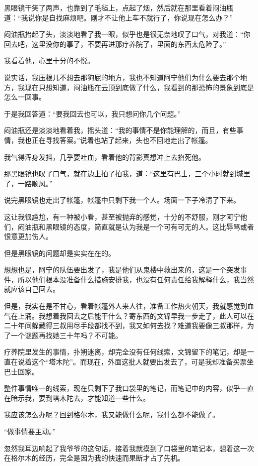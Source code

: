 黑眼镜干笑了两声，也靠到了毛毡上，点起了烟，然后就在那里看着闷油瓶道：“我说你是自找麻烦吧。刚才不让他上车不就行了，你说现在怎么办？”

闷油瓶抬起了头，淡淡地看了我一眼，似乎也是很无奈地叹了口气，对我道：“你回去吧，这里没你的事了，不要再进那疗养院了，里面的东西太危险了。”

我看着他，心里十分的不悦。

说实话，我压根儿不想去那狗屁的地方，我也不知道阿宁他们为什么要去那个地方，我现在只想知道，闷油瓶在云顶到底做了什么，我看到的那恐怖的景象到底是怎么一回事。

于是我回答道：“要我回去也可以，我只想问你几个问题。”

闷油瓶还是淡淡地看着我，摇头道：“我的事情不是你能理解的，而且，有些事情，我也正在寻找答案。”说着也站了起来，头也不回地走出了帐篷。

我气得浑身发抖，几乎要吐血，看着他的背影真想冲上去掐死他。

那黑眼镜也叹了口气，就在边上拍了拍我，道：“这里有巴士，三个小时就到城里了，一路顺风。”

说完黑眼镜也走出了帐篷，帐篷中只剩下我一个人。场面一下子冷清了下来。

这让我很尴尬，有一种被小看，甚至被抛弃的感觉，十分的不舒服，刚才阿宁他们，闷油瓶和黑眼镜的态度，简直就是认为我是一个可有可无的人。这比辱骂或者恨意更加伤人。

但是黑眼镜的问题却是实实在在的。

想想也是，阿宁的队伍要出发了，我是他们从鬼楼中救出来的，这是一个突发事件，所以他们根本没准备什么措施安排我，也没有任何责任给我解释什么，我当然就应该自己回去。

但是，我实在是不甘心，看着帐篷外人来人往，准备工作热火朝天，我就感觉到血气在上涌。我想着我回去之后能干什么？寄东西的文锦早我一步走了，此人可以在二十年间躲藏得三叔用尽手段都找不到，我又如何去找？难道我要像三叔那样，为了一个谜题再找她三十年吗？不可能。

疗养院里发生的事情，扑朔迷离，却完全没有任何线索，文锦留下的笔记，却是一直在说着这个“塔木陀”。而现在，外面这批人就要出发去了，可是我却准备买票坐巴士回家。

整件事情唯一的线索，现在只剩下了我口袋里的笔记，而笔记中的内容，似乎一直在暗示我，要到塔木陀去，才能知道一些什么。

我应该怎么办呢？回到格尔木，我又能做什么呢，我什么都不能做了。

“做事情要主动。”

忽然我耳边响起了我爷爷的这句话，接着我就摸到了口袋里的笔记本，想着这一次在格尔木的经历，完全是因为我的快速而果断才占了先机。

